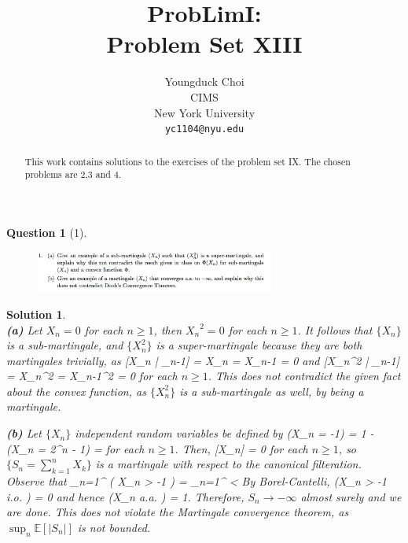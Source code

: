 \documentclass{article} %
\title{ProbLimI: \\
Problem Set XIII}
\author{
Youngduck Choi \\
CIMS \\
New York University\\
\texttt{yc1104@nyu.edu} \\
}
\def\eQb#1\eQe{\begin{eqnarray*}#1\end{eqnarray*}}
\theoremstyle{quest}
\newtheorem*{question}{Question}
\newtheorem*{solution}{Solution}
\begin{document}
\maketitle

\begin{abstract}
This work contains solutions to the exercises of the problem set IX. The
chosen problems are 2,3 and 4.
\end{abstract}

\bigskip

\begin{question}[1]
\hfill
\begin{figure}[h!]
  \centering
    \includegraphics[width=0.7\textwidth]{problim-e13-p1.png}
\end{figure}
\end{question}
\begin{solution} \hfill \\
\textbf{(a)} Let
$X_n = 0$ for each $n \geq 1$, then ${X_n}^2 = 0$ for each $n \geq 1$.
It follows that $\{X_n\}$ is a sub-martingale, and $\{X_n^{2}\}$ is a super-martingale
because they are both martingales trivially, as 
\eQb
\mathbb{E}[X_n | _{n-1}] = X_n = X_{n-1} = 0
\eQe
and
\eQb
\mathbb{E}[X_n^2 | _{n-1}] = X_n^2 = X_{n-1}^2 = 0
\eQe
for each $n \geq 1$. This does not contradict the given fact about the convex function,
as $\{X_n^2\}$ is a sub-martingale as well, by being a martingale.

\bigskip

\textbf{(b)} Let $\{ X_n \}$ independent random variables be defined by
\eQb
\mathbb{P}(X_n = -1) = 1  -  \>\>\>  \>\>\>
(X_n = 2^{n} - 1) =  
\eQe 
for each $n \geq 1$. Then,
\eQb
\mathbb{E}[X_n] = 0 
\eQe
for each $n \geq 1$, so $\{S_n = \sum_{k=1}^{n} X_k\}$ 
is a martingale with respect to the
canonical filteration. Observe that
\eQb
\sum_{n=1}^{\infty} ( X_n > -1  ) = 
\sum_{n=1}^{\infty}  < \infty
\eQe
By Borel-Cantelli,
\eQb
\mathbb{P}(X_n > -1 \>\> i.o. ) = 0 
\eQe
and hence
\eQb
\mathbb{P}(X_n   \>\> a.a. ) = 1. 
\eQe
Therefore, $S_n \to -\infty$ almost surely and we are done. This 
does not violate the Martingale convergence theorem, as 
$\sup_n \mathbb{E}[|S_n|]$ is not bounded. 

\bigskip

\end{solution}
\end{document}
